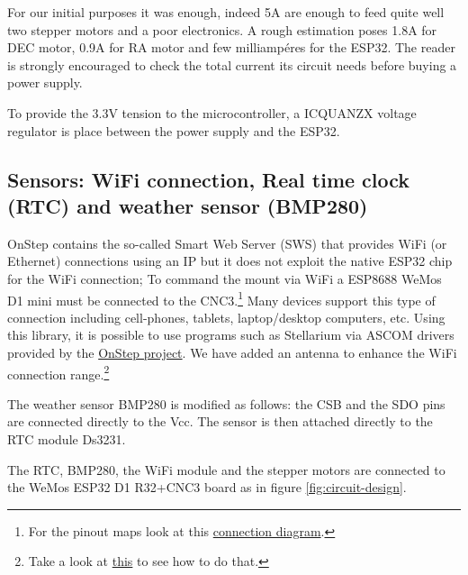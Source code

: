 For our initial purposes it was enough, indeed 5A are enough to feed quite well two stepper motors and a poor electronics.
A rough estimation poses 1.8A for DEC motor, 0.9A for RA motor and few milliampéres for the ESP32. 
The reader is strongly encouraged to check the total current its circuit needs before buying a power supply.

To provide the 3.3V tension to the microcontroller, a ICQUANZX voltage regulator is place between the power supply and the ESP32.

\subsection{Sensors: WiFi connection, Real time clock (RTC) and weather sensor (BMP280)}
OnStep contains the so-called Smart Web Server (SWS) that provides WiFi (or Ethernet) connections using an IP but it does not exploit the native ESP32 chip for the WiFi connection;
To command the mount via WiFi a ESP8688 WeMos D1 mini must be connected to the CNC3.\footnote{For the pinout maps look at this \href{https://onstep.groups.io/g/main/wiki/19670}{connection diagram}.}
Many devices support this type of connection including cell-phones, tablets, laptop/desktop computers, etc.
Using this library, it is possible to use programs such as Stellarium via ASCOM drivers provided by the \href{http://www.stellarjourney.com/index.php?r=site/software_telescope}{OnStep project}.
We have added an antenna to enhance the WiFi connection range.\footnote{Take a look at \href{https://www.instructables.com/External-Antenna-for-ESP8266/}{this} to see how to do that.}

The weather sensor BMP280 is modified as follows: the CSB and the SDO pins are connected directly to the Vcc.
The sensor is then attached directly to the RTC module Ds3231.

The RTC, BMP280, the WiFi module and the stepper motors are connected to the WeMos ESP32 D1 R32+CNC3 board as in figure \ref{fig:circuit-design}.
